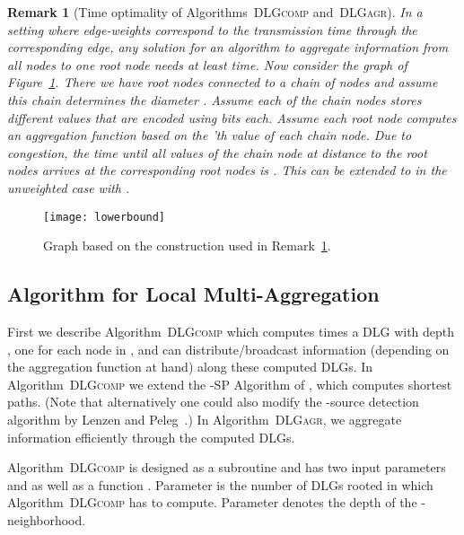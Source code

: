 \documentclass[11pt]{article}
\newtheorem{remark}[theorem]{Remark}
\newif\iffull
\newif\ifshort
\begin{document}
\fi
\begin{remark}[Time optimality of Algorithms\iffull~\ref{alg:DLGcomp}\fi~\textsc{DLGcomp} and\iffull~\ref{alg:DLGagr}\fi~\textsc{DLGagr}]\label{rem:lowerbound}
In a setting where edge-weights correspond to the transmission time through the corresponding edge, any solution for an algorithm to aggregate information from all nodes  to one root node  needs at least  time. Now consider the graph of Figure~\ref{fig:lowerbound}. There we have  root nodes  connected to a chain of  nodes and assume this chain determines the diameter . Assume each of the chain nodes stores  different values that are encoded using  bits each. Assume each root node  computes an aggregation function based on the 'th value of each chain node. Due to congestion, the time until all  values of the chain node at distance  to the root nodes arrives at the corresponding root nodes is . This can be extended to  in the unweighted case with .
\end{remark}
\begin{figure}[ht]
	\begin{center}
		\texttt{[image: lowerbound]}
	\end{center}
	\caption{Graph based on the construction used in Remark~\ref{rem:lowerbound}.}
	\label{fig:lowerbound}
\end{figure}

\subsection{Algorithm for Local Multi-Aggregation}\label{sec:aggregate}



First we describe Algorithm\iffull~\ref{alg:DLGcomp}\fi~\textsc{DLGcomp} which computes  times a DLG with depth , one for each node in , and can distribute/broadcast information (depending on the aggregation function at hand) along these computed DLGs. In Algorithm\iffull~\ref{alg:DLGcomp}\fi~\textsc{DLGcomp} we extend the -SP Algorithm of \cite{holzer2012optimal}, which computes shortest paths. (Note that alternatively one could also modify the -source detection algorithm by Lenzen and Peleg~\cite{lenzen2013efficient}.) In Algorithm\iffull~\ref{alg:DLGagr}\fi~\textsc{DLGagr}, we aggregate information efficiently through the computed DLGs.
\ifshort
\footnote{In addition to the descriptions in the text below, the pseudocode of Algorithms \textsc{DLGcomp} and \textsc{DLGagr} are stated in Appendix \ref{FULL:sec:aggregate} (for the convenience of the reviewer).}
\fi
Algorithm\iffull~\ref{alg:DLGcomp}\fi~\textsc{DLGcomp} is designed as a subroutine and has two input parameters  and  as well as a function .
Parameter  is the number of DLGs  rooted in  which Algorithm\iffull~\ref{alg:DLGcomp}\fi~\textsc{DLGcomp} has to compute.
Parameter  denotes the depth of the -neighborhood.
\end{document}
